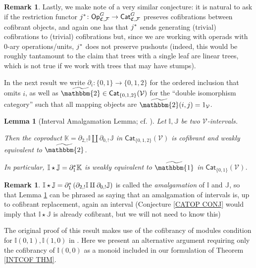 \documentclass[a4paper,10pt
,draft
]{article}%
\numberwithin{equation}{section}
\numberwithin{figure}{section}
\newtheorem{lemma}[equation]{Lemma}%
\theoremstyle{definition} %
\newtheorem{remark}[equation]{Remark}%
\newcommand{\F}{\ensuremath{\mathcal F}}
\newcommand{\V}{\ensuremath{\mathcal V}}
\newcommand{\1}{\ensuremath{\mathbbm 1}}%
\begin{document}
\begin{remark}
Lastly, we make note of a very similar conjecture:
it is natural to ask if the restriction functor
$j^{\**} \colon \mathsf{Op}_{\mathfrak{C},\F}^G 
\to \mathsf{Cat}_{\mathfrak{C},\F}^G$
preseves cofibrations between cofibrant objects,
and again one has that $j^{\**}$ 
sends generating (trivial) cofibrations to (trivial) cofibrations but,
since we are working with operads with $0$-ary operations/units,
$j^{\**}$ does not preserve pushouts
(indeed, this would be roughly tantamount to the claim that trees with a single leaf are linear trees, which is not true if we work with trees that may have stumps).
\end{remark}





In the next result we write 
$\partial_i \colon \{0,1\} \to \{0,1,2\}$
for the ordered inclusion that omits $i$,
as well as 
$\widetilde{\mathbbm{2}} \in
\mathsf{Cat}_{\{0,1,2\}}(\V)$
for the ``double isomorphism category''
such that all mapping objects are $\widetilde{\mathbbm{2}}(i,j)=1_{\V}$.



\begin{lemma}[Interval Amalgamation Lemma; 
cf. {\cite[Lemma 1.16]{BM13}}]
\label{AMALGLEM LEM}
Let $\mathbb{I},\mathbb{J}$ be two $\V$-intervals.

Then the coproduct 
$\mathbb{K} = \partial_{2,!} \mathbb{I} \amalg \partial_{0,!} \mathbb{J}$
in $\mathsf{Cat}_{\{0,1,2\}}(\V)$
is cofibrant and weakly equivalent to $\widetilde{\mathbbm{2}}$.

In particular, 
$\mathbb{I} \star \mathbb{J} = \partial_1^{\**}\mathbb{K}$
is weakly equivalent to $\widetilde{\mathbbm{1}}$
in $\mathsf{Cat}_{\{0,1\}}(\V)$.
\end{lemma}




\begin{remark}
	$\mathbb{I} \star \mathbb{J} = \partial_1^{\**} \left(\partial_{2,!} \mathbb{I} \amalg \partial_{0,!} \mathbb{J}\right)$
is called the \emph{amalgamation} of $\mathbb{I}$ and $\mathbb{J}$,
so that Lemma \ref{AMALGLEM LEM} can be phrased as saying that an amalgamation of intervals is,
up to cofibrant replacement, again an interval
(Conjecture \ref{CATOP CONJ} would imply that $\mathbb{I} \star \mathbb{J}$ is already cofibrant, 
but we will not need to know this)
\end{remark}




The original proof of this result \cite[Lemma 1.16]{BM13} makes use of the cofibrancy of modules condition for
$\mathbb{I}(0,1),\mathbb{I}(1,0)$
in \cite[Thm 1.15]{BM13}.
Here we present an alternative argument requiring only the cofibrancy of $\mathbb{I}(0,0)$ as a monoid
included in our formulation of Theorem \ref{INTCOF THM}.
\end{document}
